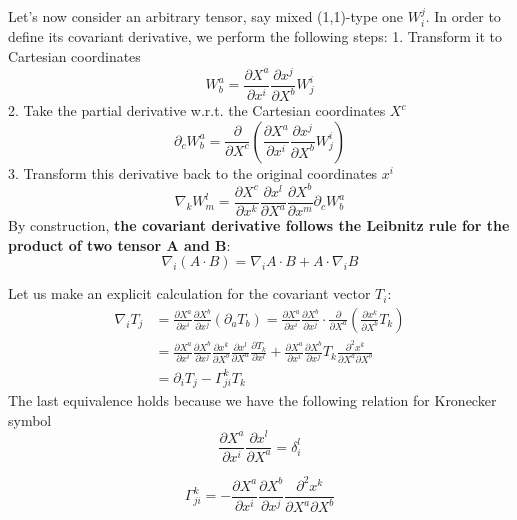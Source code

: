 Let's now consider an arbitrary tensor, say mixed (1,1)-type one $W_i^j$. In order to define its covariant derivative, we perform the following steps:
1. Transform it to Cartesian coordinates
$$
W_{b}^{a}=\frac{\partial X^{a}}{\partial x^{i}} \frac{\partial x^{j}}{\partial X^{b}} W_{j}^{i}
$$
2. Take the partial derivative w.r.t. the Cartesian coordinates $X^c$
$$
\partial_{c} W_{b}^{a}=\frac{\partial}{\partial X^{c}}\left(\frac{\partial X^{a}}{\partial x^{i}} \frac{\partial x^{j}}{\partial X^{b}} W_{j}^{i}\right)
$$
3. Transform this derivative back to the original coordinates $x^i$
$$
\nabla_{k} W_{m}^{l}=\frac{\partial X^{c}}{\partial x^{k}} \frac{\partial x^{l}}{\partial X^{a}} \frac{\partial X^{b}}{\partial x^{m}} \partial_{c} W_{b}^{a}
$$
By construction, \textbf{the covariant derivative follows the Leibnitz rule for the product of two tensor A and B}:
\begin{equation}
\nabla_{i}(A \cdot B)=\nabla_{i} A \cdot B+A \cdot \nabla_{i} B
\label{leibnitz-rule}
\end{equation}
\begin{example}
Let us make an explicit calculation for the covariant vector $T_i$:
$$
\begin{aligned}
\nabla_{i} T_{j} &=\frac{\partial X^{a}}{\partial x^{i}} \frac{\partial X^{b}}{\partial x^{j}}\left(\partial_{a} T_{b}\right)=\frac{\partial X^{a}}{\partial x^{i}} \frac{\partial X^{b}}{\partial x^{j}} \cdot \frac{\partial}{\partial X^{a}}\left(\frac{\partial x^{k}}{\partial X^{b}} T_{k}\right) \\
&=\frac{\partial X^{a}}{\partial x^{i}} \frac{\partial X^{b}}{\partial x^{j}} \frac{\partial x^{k}}{\partial X^{b}} \frac{\partial x^{l}}{\partial X^{a}} \frac{\partial T_{k}}{\partial x^{l}}+\frac{\partial X^{a}}{\partial x^{i}} \frac{\partial X^{b}}{\partial x^{j}} T_{k} \frac{\partial^{2} x^{k}}{\partial X^{a} \partial X^{b}} \\
&=\partial_{i} T_{j}-\Gamma_{j i}^{k} T_{k}
\end{aligned}
$$
The last equivalence holds because we have the following relation for Kronecker symbol
$$
\frac{\partial X^{a}}{\partial x^{i}}\frac{\partial x^{l}}{\partial X^{a}}=\delta^l_i
$$
\end{example}
\begin{qt}
\begin{equation}
\Gamma_{j i}^{k}=-\frac{\partial X^{a}}{\partial x^{i}} \frac{\partial X^{b}}{\partial x^{j}} \frac{\partial^{2} x^{k}}{\partial X^{a} \partial X^{b}}
\end{equation}
\end{qt}
